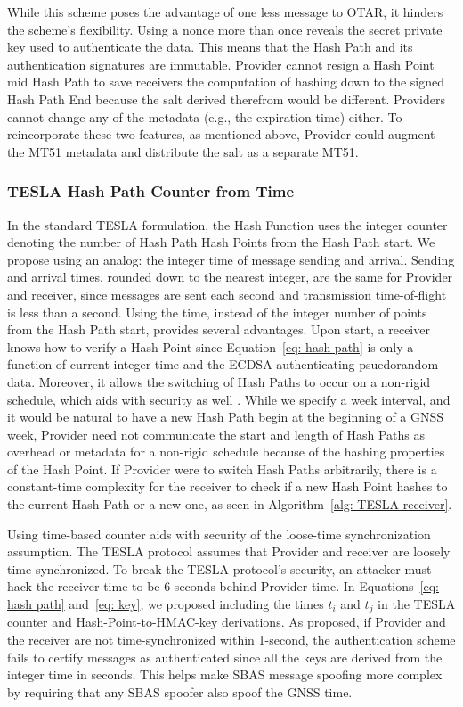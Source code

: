\documentclass[letterpaper,times]{IONconf/IONconf}
\begin{document}
			While this scheme poses the advantage of one less message to OTAR, it hinders the scheme's flexibility.
			Using a nonce more than once reveals the secret private key used to authenticate the data.
			This means that the Hash Path and its authentication signatures are immutable.
			Provider cannot resign a Hash Point mid Hash Path to save receivers the computation of hashing down to the signed Hash Path End because the salt derived therefrom would be different.
			Providers cannot change any of the metadata (e.g., the expiration time) either.
			To reincorporate these two features, as mentioned above, Provider could augment the MT51 metadata and distribute the salt as a separate MT51.

		\subsubsection{TESLA Hash Path Counter from Time} \label{subsub:time_counter}

			In the standard TESLA formulation, the Hash Function uses the integer counter denoting the number of Hash Path Hash Points from the Hash Path start.
			We propose using an analog: the integer time of message sending and arrival.
			Sending and arrival times, rounded down to the nearest integer, are the same for Provider and receiver, since messages are sent each second and transmission time-of-flight is less than a second.
			Using the time, instead of the integer number of points from the Hash Path start, provides several advantages.
			Upon start, a receiver knows how to verify a Hash Point since Equation~\eqref{eq: hash path} is only a function of current integer time and the ECDSA authenticating psuedorandom data.
			Moreover, it allows the switching of Hash Paths to occur on a non-rigid schedule, which aids with security as well \cite{chain-security}.
			While we specify a week interval, and it would be natural to have a new Hash Path begin at the beginning of a GNSS week, Provider need not communicate the start and length of Hash Paths as overhead or metadata for a non-rigid schedule because of the hashing properties of the Hash Point.
			If Provider were to switch Hash Paths arbitrarily, there is a constant-time complexity for the receiver to check if a new Hash Point hashes to the current Hash Path or a new one, as seen in Algorithm~\ref{alg: TESLA receiver}.

			Using time-based counter aids with security of the loose-time synchronization assumption.
			The TESLA protocol assumes that Provider and receiver are loosely time-synchronized.
			To break the TESLA protocol's security, an attacker must hack the receiver time to be 6 seconds behind Provider time.
			In Equations~\eqref{eq: hash path} and~\eqref{eq: key}, we proposed including the times $t_i$ and $t_j$ in the TESLA counter and Hash-Point-to-HMAC-key derivations.
			As proposed, if Provider and the receiver are not time-synchronized within 1-second, the authentication scheme fails to certify messages as authenticated since all the keys are derived from the integer time in seconds.
			This helps make SBAS message spoofing more complex by requiring that any SBAS spoofer also spoof the GNSS time.
\end{document}
